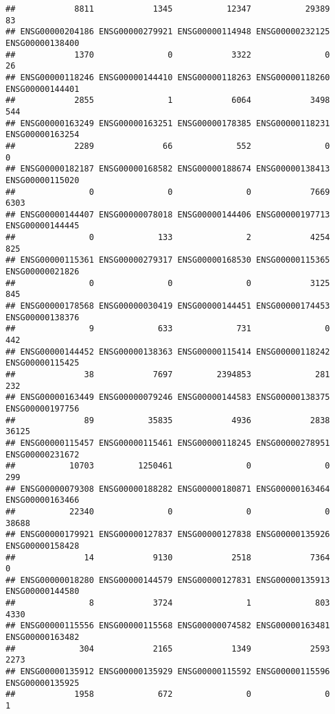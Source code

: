 \documentclass[
]{article}
\begin{document}
\begin{verbatim}
##            8811            1345           12347           29389              83 
## ENSG00000204186 ENSG00000279921 ENSG00000114948 ENSG00000232125 ENSG00000138400 
##            1370               0            3322               0              26 
## ENSG00000118246 ENSG00000144410 ENSG00000118263 ENSG00000118260 ENSG00000144401 
##            2855               1            6064            3498             544 
## ENSG00000163249 ENSG00000163251 ENSG00000178385 ENSG00000118231 ENSG00000163254 
##            2289              66             552               0               0 
## ENSG00000182187 ENSG00000168582 ENSG00000188674 ENSG00000138413 ENSG00000115020 
##               0               0               0            7669            6303 
## ENSG00000144407 ENSG00000078018 ENSG00000144406 ENSG00000197713 ENSG00000144445 
##               0             133               2            4254             825 
## ENSG00000115361 ENSG00000279317 ENSG00000168530 ENSG00000115365 ENSG00000021826 
##               0               0               0            3125             845 
## ENSG00000178568 ENSG00000030419 ENSG00000144451 ENSG00000174453 ENSG00000138376 
##               9             633             731               0             442 
## ENSG00000144452 ENSG00000138363 ENSG00000115414 ENSG00000118242 ENSG00000115425 
##              38            7697         2394853             281             232 
## ENSG00000163449 ENSG00000079246 ENSG00000144583 ENSG00000138375 ENSG00000197756 
##              89           35835            4936            2838           36125 
## ENSG00000115457 ENSG00000115461 ENSG00000118245 ENSG00000278951 ENSG00000231672 
##           10703         1250461               0               0             299 
## ENSG00000079308 ENSG00000188282 ENSG00000180871 ENSG00000163464 ENSG00000163466 
##           22340               0               0               0           38688 
## ENSG00000179921 ENSG00000127837 ENSG00000127838 ENSG00000135926 ENSG00000158428 
##              14            9130            2518            7364               0 
## ENSG00000018280 ENSG00000144579 ENSG00000127831 ENSG00000135913 ENSG00000144580 
##               8            3724               1             803            4330 
## ENSG00000115556 ENSG00000115568 ENSG00000074582 ENSG00000163481 ENSG00000163482 
##             304            2165            1349            2593            2273 
## ENSG00000135912 ENSG00000135929 ENSG00000115592 ENSG00000115596 ENSG00000135925 
##            1958             672               0               0               1 

\end{verbatim}
\end{document}
